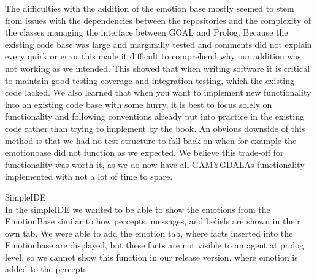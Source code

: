 \documentclass[11pt]{article}
\begin{document}
The difficulties with the addition of the emotion base mostly seemed to stem from issues with the dependencies between the repositories and the complexity of the classes managing the interface between GOAL and Prolog. Because the existing code base was large and marginally tested and comments did not explain every quirk or error this made it difficult to comprehend why our addition was not working as we intended. This showed that when writing software it is critical to maintain good testing coverage and integration testing, which the existing code lacked. We also learned that when you want to implement new functionality into an existing code base with some hurry, it is best to focus solely on functionality and following conventions already put into practice in the existing code rather than trying to implement by the book. An obvious downside of this method is that we had no test structure to fall back on when for example the emotionbase did not function as we expected. We believe this trade-off for functionality was worth it, as we do now have all GAMYGDALAs functionality implemented with not a lot of time to spare.\par
SimpleIDE\\
In the simpleIDE we wanted to be able to show the emotions from the EmotionBase similar to how percepts, messages, and beliefs are shown in their own tab. We were able to add the emotion tab, where facts inserted into the Emotionbase are displayed, but these facts are not visible to an agent at prolog level, so we cannot show this function in our release version, where emotion is added to the percepts.
\end{document}
